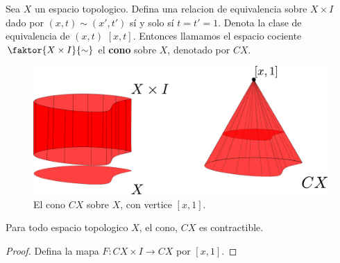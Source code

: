 \begin{definition}
    Sea $X$ un espacio topologico. Defina una relacion de equivalencia sobre $X
    \times I$ dado por $(x,t) \sim (x',t')$ s\'i y solo s\'i $t=t'=1$. Denota la
    clase de equivalencia de $(x,t)$ $[x,t]$. Entonces llamamos el espacio
    cociente $\faktor{X \times I}{\sim}$ el \textbf{cono} sobre $X$, denotado
    por  $CX$.
\end{definition}

\begin{figure}[h]
    \centering
    \includegraphics[scale=0.1]{Figures/cono_x.eps}
    \caption{El cono $CX$ sobre $X$, con vertice  $[x,1]$.}
    \label{fig_20}
\end{figure}

\begin{theorem}\label{thm_8.16}
    Para todo espacio topologico $X$, el cono,  $CX$ es contractible.
\end{theorem}
\begin{proof}
    Defina la mapa $F:CX \times I \xrightarrow{} CX$ por $[x,1]$.
\end{proof}


